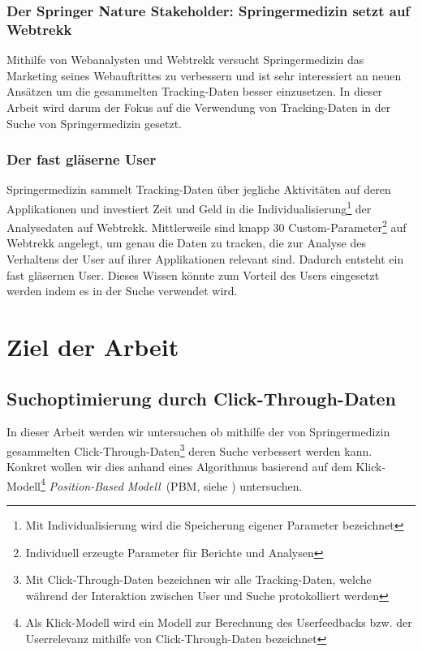 \subsubsection{Der Springer Nature Stakeholder: Springermedizin setzt auf Webtrekk}
\label{sec:Einfuehrung:Problemstellung:Springermedizin}

Mithilfe von Webanalysten und Webtrekk versucht Springermedizin das Marketing seines Webauftrittes zu verbessern und ist sehr interessiert an neuen Ansätzen um die gesammelten Tracking-Daten besser einzusetzen. In dieser Arbeit wird darum der Fokus auf die Verwendung von Tracking-Daten in der Suche von Springermedizin gesetzt. 
 
\subsubsection{Der fast gläserne User}
\label{sec:Einfuehrung:Problemstellung:Glaeserne-User}

Springermedizin sammelt Tracking-Daten über jegliche Aktivitäten auf deren Applikationen und investiert Zeit und Geld in die Individualisierung\footnote{Mit Individualisierung wird die Speicherung eigener Parameter bezeichnet} der Analysedaten auf Webtrekk. Mittlerweile sind knapp 30 Custom-Parameter\footnote{Individuell erzeugte Parameter für Berichte und Analysen} auf Webtrekk angelegt, um genau die Daten zu tracken, die zur Analyse des Verhaltens der User auf ihrer Applikationen relevant sind. Dadurch entsteht ein fast \glqq gläsernen User\grqq{}. Dieses Wissen könnte zum Vorteil des Users eingesetzt werden indem es in der Suche verwendet wird.

\pagebreak
\section{Ziel der Arbeit}
\label{sec:Einfuehrung:ZielArbeit}

\subsection{Suchoptimierung durch Click-Through-Daten}
\label{sec:Einfuehrung:ZielArbeit:Suchoptimierung}

In dieser Arbeit werden wir untersuchen ob mithilfe der von Springermedizin gesammelten Click-Through-Daten\footnote{Mit Click-Through-Daten bezeichnen wir alle Tracking-Daten, welche während der Interaktion zwischen User und Suche protokolliert werden} deren Suche verbessert werden kann. Konkret wollen wir dies anhand eines Algorithmus basierend auf dem Klick-Modell\footnote{Als Klick-Modell wird ein Modell zur Berechnung des Userfeedbacks bzw. der Userrelevanz mithilfe von Click-Through-Daten bezeichnet} \textit{Position-Based Modell}~(PBM, siehe \cite{pbm}) untersuchen.

